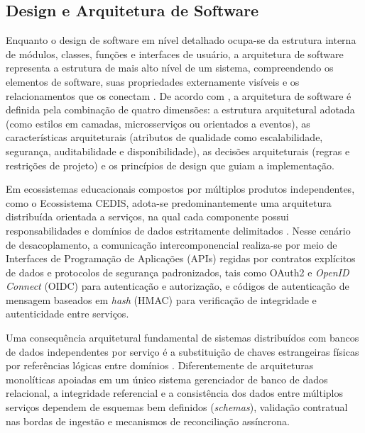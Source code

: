 \subsection{Design e Arquitetura de Software}
\label{subsec:design-arquitetura}

Enquanto o design de software em nível detalhado ocupa-se da estrutura interna de módulos, classes, funções e interfaces de usuário, a arquitetura de software representa a estrutura de mais alto nível de um sistema, compreendendo os elementos de software, suas propriedades externamente visíveis e os relacionamentos que os conectam \cite{bass_software_2021}. De acordo com , a arquitetura de software é definida pela combinação de quatro dimensões: a estrutura arquitetural adotada (como estilos em camadas, microsserviços ou orientados a eventos), as características arquiteturais (atributos de qualidade como escalabilidade, segurança, auditabilidade e disponibilidade), as decisões arquiteturais (regras e restrições de projeto) e os princípios de design que guiam a implementação.

Em ecossistemas educacionais compostos por múltiplos produtos independentes, como o Ecossistema CEDIS, adota-se predominantemente uma arquitetura distribuída orientada a serviços, na qual cada componente possui responsabilidades e domínios de dados estritamente delimitados \cite{richards_fundamentals_2020}. Nesse cenário de desacoplamento, a comunicação intercomponencial realiza-se por meio de Interfaces de Programação de Aplicações (APIs) regidas por contratos explícitos de dados e protocolos de segurança padronizados, tais como OAuth2 e \textit{OpenID Connect} (OIDC) para autenticação e autorização, e códigos de autenticação de mensagem baseados em \textit{hash} (HMAC) para verificação de integridade e autenticidade entre serviços.

Uma consequência arquitetural fundamental de sistemas distribuídos com bancos de dados independentes por serviço é a substituição de chaves estrangeiras físicas por referências lógicas entre domínios \cite{kleppmann_designing_2017}. Diferentemente de arquiteturas monolíticas apoiadas em um único sistema gerenciador de banco de dados relacional, a integridade referencial e a consistência dos dados entre múltiplos serviços dependem de esquemas bem definidos (\textit{schemas}), validação contratual nas bordas de ingestão e mecanismos de reconciliação assíncrona.

